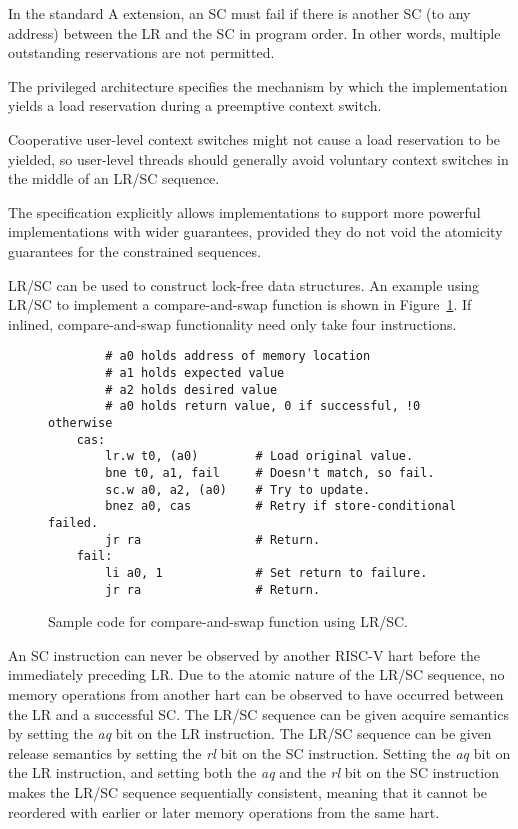In the standard A extension, an SC must fail if there is another SC (to
any address) between the LR and the SC in program order.  In other
words, multiple outstanding reservations are not permitted.

\begin{commentary}
The privileged architecture specifies the mechanism by which the
implementation yields a load reservation during a preemptive context switch.

Cooperative user-level context switches might not cause a load reservation
to be yielded, so user-level threads should generally avoid voluntary
context switches in the middle of an LR/SC sequence.
\end{commentary}

\begin{commentary}
The specification explicitly allows implementations to support more
powerful implementations with wider guarantees, provided they do not
void the atomicity guarantees for the constrained sequences.
\end{commentary}

LR/SC can be used to construct lock-free data structures.  An example
using LR/SC to implement a compare-and-swap function is shown in
Figure~\ref{cas}.  If inlined, compare-and-swap functionality need
only take four instructions.

\begin{figure}[h!]
\begin{center}
\begin{verbatim}
        # a0 holds address of memory location 
        # a1 holds expected value
        # a2 holds desired value
        # a0 holds return value, 0 if successful, !0 otherwise
    cas:
        lr.w t0, (a0)        # Load original value.
        bne t0, a1, fail     # Doesn't match, so fail.
        sc.w a0, a2, (a0)    # Try to update.
        bnez a0, cas         # Retry if store-conditional failed.
        jr ra                # Return.
    fail:
        li a0, 1             # Set return to failure.
        jr ra                # Return.
\end{verbatim}
\end{center}
\caption{Sample code for compare-and-swap function using LR/SC.}
\label{cas}
\end{figure}

An SC instruction can never be observed by another RISC-V hart
before the immediately preceding LR.  Due to the atomic nature of the
LR/SC sequence, no memory operations from another hart can be observed
to have occurred between the LR and a successful SC.  The LR/SC
sequence can be given acquire semantics by setting the {\em aq} bit on
the LR instruction.  The LR/SC sequence can be given release semantics
by setting the {\em rl} bit on the SC instruction.  Setting the {\em
  aq} bit on the LR instruction, and setting both the {\em aq} and the {\em
  rl} bit on the SC instruction makes the LR/SC sequence sequentially
consistent, meaning that it cannot be reordered with earlier or
later memory operations from the same hart.

